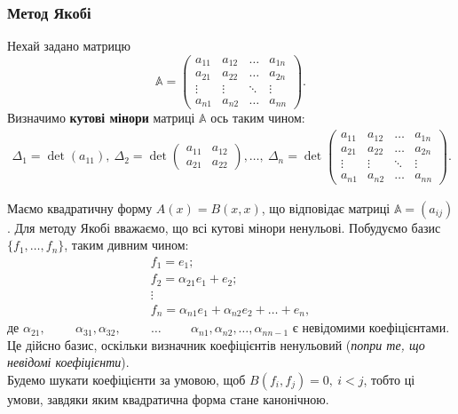 \documentclass{math_library}
\begin{document}
\subsubsection{Метод Якобі}
\begin{definition}
Нехай задано матрицю 
\[
\mathbb{A} = \begin{pmatrix}
a_{11} & a_{12} & \dots & a_{1n} \\
a_{21} & a_{22} & \dots & a_{2n} \\
\vdots & \vdots & \ddots & \vdots \\
a_{n1} & a_{n2} & \dots & a_{nn} 
\end{pmatrix}.
\]
Визначимо \textbf{кутові мінори} матриці $\mathbb{A}$ ось таким чином:
\begin{align*}
\Delta_1 = \det (a_{11}),\ \Delta_2 = \det \begin{pmatrix}
a_{11} & a_{12} \\
a_{21} & a_{22}
\end{pmatrix}, \dots,\ \Delta_n = \det \begin{pmatrix}
a_{11} & a_{12} & \dots & a_{1n} \\
a_{21} & a_{22} & \dots & a_{2n} \\
\vdots & \vdots & \ddots & \vdots \\
a_{n1} & a_{n2} & \dots & a_{nn} 
\end{pmatrix}.
\end{align*}
\end{definition}
\noindent
Маємо квадратичну форму $A(x) = B(x,x)$, що відповідає матриці $\mathbb{A} = (a_{ij})$. Для методу Якобі вважаємо, що всі кутові мінори ненульові. Побудуємо базис $\{f_1,\dots,f_n\}$, таким дивним чином:
\begin{align*}
f_1 = e_1;\\
f_2 = \alpha_{21}e_1 + e_2;\\
\vdots\\
f_n = \alpha_{n1}e_1 + \alpha_{n2}e_2 + \dots + e_n,
\end{align*}
де $\alpha_{21}, \hspace{1cm} \alpha_{31}, \alpha_{32}, \hspace{1cm} \dots \hspace{1cm} \alpha_{n1}, \alpha_{n2}, \dots, \alpha_{nn-1}$ є невідомими коефіцієнтами. Це дійсно базис, оскільки визначник коефіцієнтів ненульовий (\textit{попри те, що невідомі коефіцієнти}).\\
Будемо шукати коефіцієнти за умовою, щоб $B(f_i,f_j) = 0,\ i < j$, тобто ці умови, завдяки яким квадратична форма стане канонічною.\\
\end{document}
